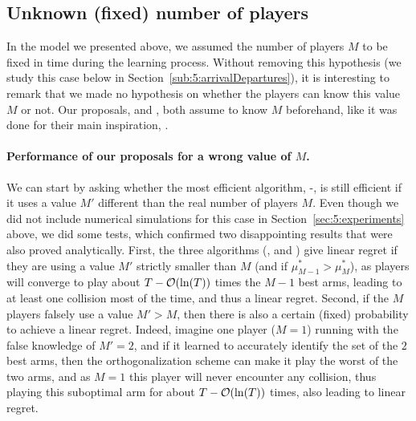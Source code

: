 




\subsection{Unknown (fixed) number of players}
\label{sub:5:unknownNumberOfPlayers}

In the model we presented above, we assumed the number of players $M$ to be fixed in time during the learning process.
Without removing this hypothesis (we study this case below in Section~\ref{sub:5:arrivalDepartures}), it is interesting to remark that we made no hypothesis on whether the players can know this value $M$ or not.
Our proposals, \RandTopM{} and \MCTopM, both assume to know $M$ beforehand, like it was done for their main inspiration, \RhoRand.


\paragraph{Performance of our proposals for a wrong value of $M$.}
\label{par:5:usingWrongValueofM}
%
We can start by asking whether the most efficient algorithm, \MCTopM-\klUCB, is still efficient if it uses a value $M'$ different than the real number of players $M$.
Even though we did not include numerical simulations for this case in Section~\ref{sec:5:experiments} above, we did some tests, which confirmed two disappointing results that were also proved analytically.
First, the three algorithms (\RhoRand, \RandTopM{} and \MCTopM) give linear regret if they are using a value $M'$ strictly smaller than $M$ (and if $\mu^*_{M-1} > \mu^*_M$), as players will converge to play about $T-\mathop{}\mathopen{}\mathcal{O}\mathopen{}\left(\ln(T)\right)$ times the $M-1$ best arms, leading to at least one collision most of the time, and thus a linear regret.
Second, if the $M$ players falsely use a value $M' > M$, then there is also a certain (fixed) probability to achieve a linear regret. Indeed, imagine one player ($M=1$) running \MCTopM{} with the false knowledge of $M'=2$, and if it learned to accurately identify the set of the $2$ best arms, then the \MCTopM{} orthogonalization scheme can make it play the worst of the two arms, and as $M=1$ this player will never encounter any collision, thus playing this suboptimal arm for about $T-\mathop{}\mathopen{}\mathcal{O}\mathopen{}\left(\ln(T)\right)$ times, also leading to linear regret.


